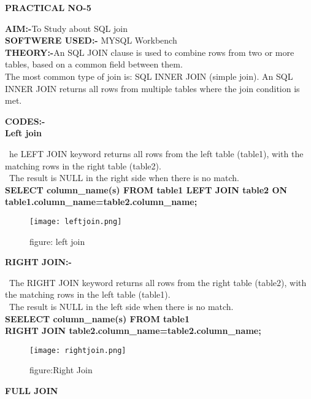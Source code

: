 \documentclass[a4paper,0pt]{article}
\begin{document}
\begin{center}
\textbf{\LARGE PRACTICAL NO-5}\\[1cm]
\end{center}
\textbf{AIM:-}To Study about SQL join\\[5mm]
\textbf{SOFTWERE USED:-} MYSQL Workbench\\[5mm]
\textbf{THEORY:-}An SQL JOIN clause is used to combine rows from two or more tables, based on a common field between them.\\[1mm]
The most common type of join is: SQL INNER JOIN (simple join). An SQL INNER JOIN returns all rows from multiple tables where the join condition is met.\\[2MM]
\begin{center}
\textbf{CODES:-}\\[2mm]
\textbf{\normalsize Left join}\\[2mm]
\end{center}
\ he LEFT JOIN keyword returns all rows from the left table (table1), with the matching rows in the right table (table2).\\[1mm]
\ The result is NULL in the right side when there is no match.\\[1mm]
\textbf{ SELECT column\_name(s)  FROM table1 LEFT JOIN table2 ON table1.column\_name=table2.column\_name;}\\
\begin{figure}[h!]
\texttt{[image: leftjoin.png]}
\centering
\caption{figure: left join}
\end{figure}
\newpage
\begin{center}
\textbf{RIGHT JOIN:-}\\[2mm]
\end{center}
\ The RIGHT JOIN keyword returns all rows from the right table (table2), with the matching rows in the left table (table1).\\[1mm]
\ The result is NULL in the left side when there is no match.\\[1mm]
\textbf{SEELECT column\_name(s) FROM table1}\\[1mm]
\textbf{ RIGHT JOIN table2.column\_name=table2.column\_name;}\\[1mm]
\begin{figure}[h!]
\texttt{[image: rightjoin.png]}
\caption{figure:Right Join}
\end{figure}
\begin{center}
\textbf{ FULL JOIN}\\[2MM]
\end{center}
\end{document}
